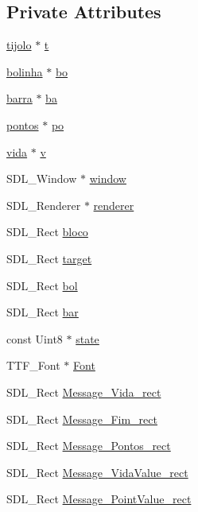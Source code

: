 \subsection*{Private Attributes}
\begin{DoxyCompactItemize}
\item 
\hyperlink{classtijolo}{tijolo} $\ast$ \hyperlink{classview_a952fdfafefca2c0bfc8b17647a5706be}{t}
\item 
\hyperlink{classbolinha}{bolinha} $\ast$ \hyperlink{classview_a9d44d190dd69b906bfeaac4559ee454e}{bo}
\item 
\hyperlink{classbarra}{barra} $\ast$ \hyperlink{classview_a0fd146110ca95e73f43c1dbda5a41294}{ba}
\item 
\hyperlink{classpontos}{pontos} $\ast$ \hyperlink{classview_a8dc345a9799a79220ecca66c4cd3e8ff}{po}
\item 
\hyperlink{classvida}{vida} $\ast$ \hyperlink{classview_ae0f8e281f5f7937d84f435437ce03546}{v}
\item 
S\+D\+L\+\_\+\+Window $\ast$ \hyperlink{classview_ade09c2dbabd1bf59ffaf625156c514f0}{window}
\item 
S\+D\+L\+\_\+\+Renderer $\ast$ \hyperlink{classview_a8d7b3ec0a0641d24cdc3b04949f5df45}{renderer}
\item 
S\+D\+L\+\_\+\+Rect \hyperlink{classview_ae22fb0558e890ff6ace089b603e2d6d8}{bloco}
\item 
S\+D\+L\+\_\+\+Rect \hyperlink{classview_a49a628eedba666db008f8c07b96e3a51}{target}
\item 
S\+D\+L\+\_\+\+Rect \hyperlink{classview_a72e360ef18105e2c565f17be3768027d}{bol}
\item 
S\+D\+L\+\_\+\+Rect \hyperlink{classview_a9c94bf9b55b5c24c5a9289d82a969ebb}{bar}
\item 
const Uint8 $\ast$ \hyperlink{classview_a6fd7fc350d9ad94dfd47e324b107e8ce}{state}
\item 
T\+T\+F\+\_\+\+Font $\ast$ \hyperlink{classview_ad17acebf948f7f42aa7cb8f88a38fe21}{Font}
\item 
S\+D\+L\+\_\+\+Rect \hyperlink{classview_af1b48d8a8f7f9e16800f9d842717ed2c}{Message\+\_\+\+Vida\+\_\+rect}
\item 
S\+D\+L\+\_\+\+Rect \hyperlink{classview_aba853e73ed61ec0078ff6e56bb57e702}{Message\+\_\+\+Fim\+\_\+rect}
\item 
S\+D\+L\+\_\+\+Rect \hyperlink{classview_ada3fc542a5e8b9d9e002665b37af781b}{Message\+\_\+\+Pontos\+\_\+rect}
\item 
S\+D\+L\+\_\+\+Rect \hyperlink{classview_a1a7059536cb8e091ff7d4a4f2526bcce}{Message\+\_\+\+Vida\+Value\+\_\+rect}
\item 
S\+D\+L\+\_\+\+Rect \hyperlink{classview_ade4cd2992600a54f7cb1f9f20876cd75}{Message\+\_\+\+Point\+Value\+\_\+rect}
\end{DoxyCompactItemize}


